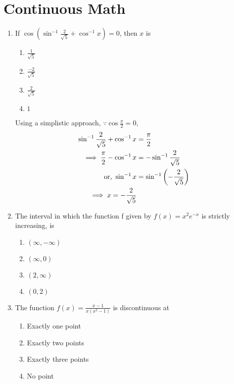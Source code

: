 \documentclass[journal,12pt,twocolumn]{IEEEtran}
\renewcommand\thesection{\arabic{section}}
\begin{document}
\section{Continuous Math}
\renewcommand{\theequation}{\theenumi}
\begin{enumerate}[label=\thesection.\arabic*.,ref=\thesection.\theenumi]
\item If $\cos (\sin^{-1} \frac{2}{\sqrt 5} + \cos^{-1} x) = 0$, then $x$ is  

\begin{enumerate}
   \item $\frac{1}{\sqrt5}$\\
   \item $ \frac{-2}{\sqrt5}$\\
    \item $ \frac{2}{\sqrt5}$\\
    \item $1$
\end{enumerate}
		\solution  Using a simplistic approach,  $\because \cos \frac{\pi}{2} = 0$,
		\begin{align}
			\sin^{-1} \frac{2}{\sqrt 5} + \cos^{-1} x &= \frac{\pi}{2}
			\\
			\implies \frac{\pi}{2} -\cos^{-1}x &= - \sin^{-1} \frac{2}{\sqrt 5} 
			\\
			\text{or, }\sin^{-1}x &=  \sin^{-1} \left(-\frac{2}{\sqrt 5}   \right)
			\\
			\implies x = -\frac{2}{\sqrt 5}   
		\end{align}
\item The interval in which the function f given by $ f({x}) = x^2e^{-x} $ is strictly increasing,  is

\begin{enumerate}
    \item $\left(\infty , -\infty \right)$
    \item $\left(\infty , 0 \right)$
    \item $\left(2 , \infty \right)$
    \item $\left(0 , 2 \right)$
\end{enumerate}
\item The function $ f\left({x} \right) = \frac{x-1}{x\left(x^2 -1 \right)} $ is discontinuous at

\begin{enumerate}
    \item Exactly one point
    \item Exactly two points
    \item Exactly three points
    \item No point
\end{enumerate}


\end{enumerate}
\end{document}
